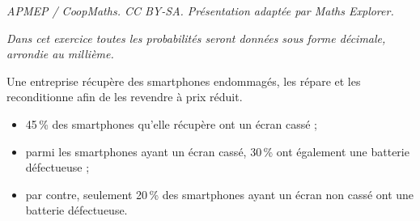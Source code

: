 \documentclass[10pt]{article}
\begin{document}
\noindent\textit{APMEP / CoopMaths. CC BY-SA. Présentation adaptée par Maths Explorer.}\par\medskip
\medskip

\emph{Dans cet exercice toutes les probabilités seront données sous forme décimale, arrondie au
millième.}
\medskip


Une entreprise récupère des smartphones endommagés, les répare et les reconditionne afin de
les revendre à prix réduit.

\begin{itemize}
\item  45\,\% des smartphones qu’elle récupère ont un écran cassé ; 
\item  parmi les smartphones ayant un écran cassé, 30\,\% ont également une batterie
défectueuse ;
 \item par contre, seulement 20\,\% des smartphones ayant un écran non cassé ont une batterie
défectueuse.
\end{itemize}
\end{document}
